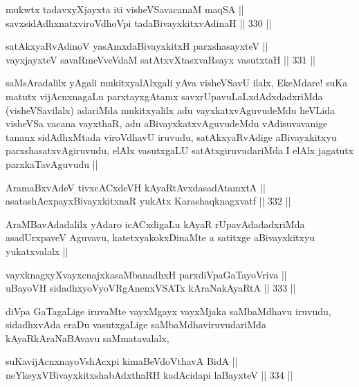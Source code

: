 \begin{shl}
mukwtx tadavxyXjayxta iti visheVSavacanaM maqSA || \\
savxsidAdhxnatxviroVdhoV\s pi tadaBivayxkitxvAdinaH ||  330 ||  
\end{shl}

\begin{shl}
satAkxyaRvAdinoV yasAmxdaBivayxkitxH parxshasayxteV ||  \\
vayxjayxteV savaRmeVveVdaM satAtxvXtasxvaRsayx vasutxtaH ||  331 ||  
\end{shl}

\begin{artha}
saMsAradalilx yAgali mukitxyalAlxgali yAva visheVSavU ilalx, EkeMdare!
suKa matutx vijAcnxnagaLu parxtayxgAtamx savxrUpavuLaLxdAdxdadxriMda
(visheVSavilalx) adariMda mukitxyalilx adu vayxkatxvAguvudeMdu heVLida
visheVSa vacana vayxthaR, adu aBivayxkatxvAguvudeMdu vAdisuvavanige
tananx sidAdhxMtada viroVdhavU iruvudu, satAkxyaRvAdige aBivayxkitxyu
parxshasatxvAgiruvudu, elAlx vasutxgaLU satAtxgiruvudariMda I elAlx
jagatutx parxkaTavAguvudu ||
\end{artha}

\begin{shl}
AramaBxvAdeV tivxcACxdeVH kAyaRtAvxdasadAtamxtA || \\
asatashAcxpayxBivayxkitxnaR yukAtx Karashaqknagxvatf ||  332 ||  
\end{shl}

\begin{artha}
AraMBavAdadalilx yAdaro icACxdigaLu kAyaR rUpavAdadadxriMda
asadUrxpaveV Aguvavu, katetxyakokxDinaMte a satitxge aBivayxkitxyu
yukatxvalalx ||
\end{artha}

\begin{shl}
vayxknagxyXvayxcnajxkasaMbanadhxH parxdiVpaGaTayoVriva || \\
uBayoVH sidadhxyoVyoVRgAnenxVSATx kAraNakAyaRtA ||  333 ||  
\end{shl}

\begin{artha}
diVpa GaTagaLige iruvaMte vayxMgayx vayxMjaka saMbaMdhavu iruvudu,
sidadhxvAda eraDu vasutxgaLige saMbaMdhaviruvudariMda
kAyaRkAraNaBAvavu saMmatavalalx,
\end{artha}

\begin{shl}
suKavijAcnxnayoVshAcxpi kimaBeVdoV\s thavA BidA || \\
neYkeyxV\s BivayxkitxshabAdxthaRH kadAcidapi laBayxteV ||  334 ||  
\end{shl}

